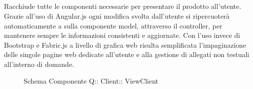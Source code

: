 \subsection{}
Racchiude tutte le componenti necessarie per presentare il prodotto all'utente.
Grazie all'uso di Angular.js ogni modifica svolta dall'utente si ripercuoterà automaticamente a sulla componente model, attraverso il controller, per mantenere sempre le informazioni consistenti e aggiornate.
Con l'uso invece di Bootstrap e Fabric.js a livello di grafica web risulta semplificata l'impaginazione delle singole pagine web dedicate all'utente e alla gestione di allegati non testuali all'interno di domande.
\begin{figure}[H]
\centering
\noindent{}
\caption[Schema Componente Quizzipedia::Client::ViewClient]{Schema Componente Q:: Client:: ViewClient}
\end{figure}
